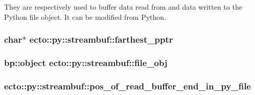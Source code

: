 \-They are respectively used to buffer data read from and data written to the \-Python file object. \-It can be modified from \-Python. \hypertarget{classecto_1_1py_1_1streambuf_a8267e360cfb0201b1518a0dfd3d7c353}{
\subsubsection[{farthest\-\_\-pptr}]{\setlength{\rightskip}{0pt plus 5cm}char$\ast$ {\bf ecto\-::py\-::streambuf\-::farthest\-\_\-pptr}}}\label{classecto_1_1py_1_1streambuf_a8267e360cfb0201b1518a0dfd3d7c353}
\hypertarget{classecto_1_1py_1_1streambuf_a63254ed85f60504895f526272e19dd34}{
\subsubsection[{file\-\_\-obj}]{\setlength{\rightskip}{0pt plus 5cm}bp\-::object {\bf ecto\-::py\-::streambuf\-::file\-\_\-obj}}}\label{classecto_1_1py_1_1streambuf_a63254ed85f60504895f526272e19dd34}
\hypertarget{classecto_1_1py_1_1streambuf_a7b219ca66aa176fdfbc9d6fb63d15cef}{
\subsubsection[{pos\-\_\-of\-\_\-read\-\_\-buffer\-\_\-end\-\_\-in\-\_\-py\-\_\-file}]{ {\bf ecto\-::py\-::streambuf\-::pos\-\_\-of\-\_\-read\-\_\-buffer\-\_\-end\-\_\-in\-\_\-py\-\_\-file}}}\label{classecto_1_1py_1_1streambuf_a7b219ca66aa176fdfbc9d6fb63d15cef}
